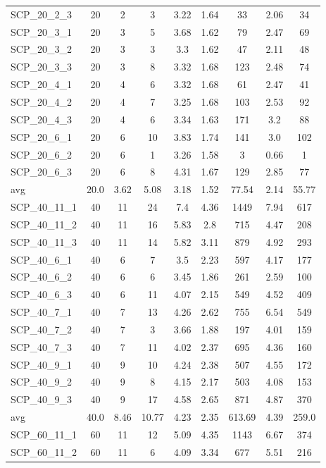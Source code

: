 \begin{table}[!ht]
{\begin{tabular}{lcccccccc}
SCP\_20\_2\_3 & 20 & 2 & 3 & 3.22 & 1.64 & 33 & 2.06 & 34 \\
SCP\_20\_3\_1 & 20 & 3 & 5 & 3.68 & 1.62 & 79 & 2.47 & 69 \\
SCP\_20\_3\_2 & 20 & 3 & 3 & 3.3 & 1.62 & 47 & 2.11 & 48 \\
SCP\_20\_3\_3 & 20 & 3 & 8 & 3.32 & 1.68 & 123 & 2.48 & 74 \\
SCP\_20\_4\_1 & 20 & 4 & 6 & 3.32 & 1.68 & 61 & 2.47 & 41 \\
SCP\_20\_4\_2 & 20 & 4 & 7 & 3.25 & 1.68 & 103 & 2.53 & 92 \\
SCP\_20\_4\_3 & 20 & 4 & 6 & 3.34 & 1.63 & 171 & 3.2 & 88 \\
SCP\_20\_6\_1 & 20 & 6 & 10 & 3.83 & 1.74 & 141 & 3.0 & 102 \\
SCP\_20\_6\_2 & 20 & 6 & 1 & 3.26 & 1.58 & 3 & 0.66 & 1 \\
SCP\_20\_6\_3 & 20 & 6 & 8 & 4.31 & 1.67 & 129 & 2.85 & 77 \\
\hline avg & 20.0 & 3.62 & 5.08& 3.18 & 1.52& 77.54 & 2.14& 55.77\\ \hline
SCP\_40\_11\_1 & 40 & 11 & 24 & 7.4 & 4.36 & 1449 & 7.94 & 617 \\
SCP\_40\_11\_2 & 40 & 11 & 16 & 5.83 & 2.8 & 715 & 4.47 & 208 \\
SCP\_40\_11\_3 & 40 & 11 & 14 & 5.82 & 3.11 & 879 & 4.92 & 293 \\
SCP\_40\_6\_1 & 40 & 6 & 7 & 3.5 & 2.23 & 597 & 4.17 & 177 \\
SCP\_40\_6\_2 & 40 & 6 & 6 & 3.45 & 1.86 & 261 & 2.59 & 100 \\
SCP\_40\_6\_3 & 40 & 6 & 11 & 4.07 & 2.15 & 549 & 4.52 & 409 \\
SCP\_40\_7\_1 & 40 & 7 & 13 & 4.26 & 2.62 & 755 & 6.54 & 549 \\
SCP\_40\_7\_2 & 40 & 7 & 3 & 3.66 & 1.88 & 197 & 4.01 & 159 \\
SCP\_40\_7\_3 & 40 & 7 & 11 & 4.02 & 2.37 & 695 & 4.36 & 160 \\
SCP\_40\_9\_1 & 40 & 9 & 10 & 4.24 & 2.38 & 507 & 4.55 & 172 \\
SCP\_40\_9\_2 & 40 & 9 & 8 & 4.15 & 2.17 & 503 & 4.08 & 153 \\
SCP\_40\_9\_3 & 40 & 9 & 17 & 4.58 & 2.65 & 871 & 4.87 & 370 \\
\hline avg & 40.0 & 8.46 & 10.77& 4.23 & 2.35& 613.69 & 4.39& 259.0\\ \hline
SCP\_60\_11\_1 & 60 & 11 & 12 & 5.09 & 4.35 & 1143 & 6.67 & 374 \\
SCP\_60\_11\_2 & 60 & 11 & 6 & 4.09 & 3.34 & 677 & 5.51 & 216 \\

\end{tabular}}
\end{table}
